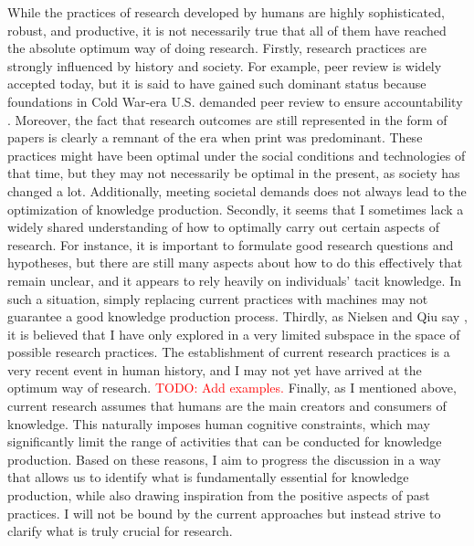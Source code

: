 \documentclass{book}
\begin{document}
While the practices of research developed by humans are highly sophisticated, robust, and productive, it is not necessarily true that all of them have reached the absolute optimum way of doing research. Firstly, research practices are strongly influenced by history and society. For example, peer review is widely accepted today, but it is said to have gained such dominant status because foundations in Cold War-era U.S. demanded peer review to ensure accountability \cite{baldwin2018scientific}. Moreover, the fact that research outcomes are still represented in the form of papers is clearly a remnant of the era when print was predominant. These practices might have been optimal under the social conditions and technologies of that time, but they may not necessarily be optimal in the present, as society has changed a lot. Additionally, meeting societal demands does not always lead to the optimization of knowledge production. Secondly, it seems that I sometimes lack a widely shared understanding of how to optimally carry out certain aspects of research. For instance, it is important to formulate good research questions and hypotheses, but there are still many aspects about how to do this effectively that remain unclear, and it appears to rely heavily on individuals' tacit knowledge. In such a situation, simply replacing current practices with machines may not guarantee a good knowledge production process. Thirdly, as Nielsen and Qiu say \cite{nielsen}, it is believed that I have only explored in a very limited subspace in the space of possible research practices. The establishment of current research practices is a very recent event in human history, and I may not yet have arrived at the optimum way of research. \textcolor{red}{TODO: Add examples.} Finally, as I mentioned above, current research assumes that humans are the main creators and consumers of knowledge. This naturally imposes human cognitive constraints, which may significantly limit the range of activities that can be conducted for knowledge production. Based on these reasons, I aim to progress the discussion in a way that allows us to identify what is fundamentally essential for knowledge production, while also drawing inspiration from the positive aspects of past practices. I will not be bound by the current approaches but instead strive to clarify what is truly crucial for research.
\end{document}
